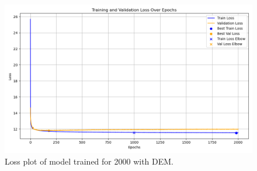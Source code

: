 \begin{figure}
    \centering
    \includegraphics[scale = 0.6]{Figures/loss_plot_w_elevation.png}
    \caption[Loss plot of model trained for 2000 with DEM.]{Loss plot of model trained for 2000 with DEM.}
    \label{fig:loss_plot_w_elevation}
\end{figure}